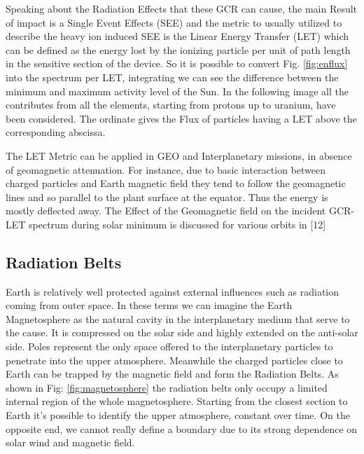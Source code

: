 \documentclass[./dissertation.tex]{subfiles}
\begin{document}
Speaking about the Radiation Effects that these GCR can cause, the main Result of impact is a Single Event Effects (SEE) and the metric to usually utilized to describe the heavy ion induced SEE is the Linear Energy Transfer (LET) which can be defined as the energy lost by the ionizing particle per unit of path length in the sensitive section of the device. So it is possible to convert Fig. \ref{fig:enflux} into the spectrum per LET, integrating we can see the difference between the minimum and maximum activity level of the Sun. In the following image all the contributes from all the elements, starting from protons up to uranium, have been considered. The ordinate gives the Flux of particles having a LET above the corresponding abscissa. 

The LET Metric can be applied in GEO and Interplanetary missions, in absence of geomagnetic attenuation. For instance, due to basic interaction between charged particles and Earth magnetic field they tend to follow the geomagnetic lines and so parallel to the plant surface at the equator. Thus the energy is mostly deflected away. The Effect of the Geomagnetic field on the incident GCR-LET spectrum during solar minimum is discussed for various orbits in [12]


\subsection{Radiation Belts}
Earth is relatively well protected against external influences such as radiation coming from outer space. In these terms we can imagine the Earth Magnetosphere as the natural cavity in the interplanetary medium that serve to the cause. It is compressed on the solar side and highly extended on the anti-solar side. Poles represent the only space offered to the interplanetary particles to penetrate into the upper atmosphere. Meanwhile the charged particles close to Earth can be trapped by the magnetic field and form the Radiation Belts. As shown in Fig: \ref{fig:magnetosphere} the radiation belts only occupy a limited internal region of the whole magnetosphere. Starting from the closest section to Earth it's possible to identify the upper atmosphere, constant over time. On the opposite end, we cannot really define a boundary due to its strong dependence on solar wind and magnetic field.
\end{document}
